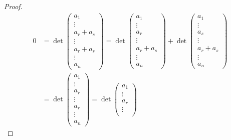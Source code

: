 \documentclass[letterpaper]{article}
\begin{document}
\begin{enumerate}
\begin{enumerate}[label=(\alph*)]
\begin{proof}
    \begin{align*}
        0
        &=
            \det\begin{pmatrix}
                a_1\\
                \vdots\\
                a_r + a_s\\
                \vdots\\
                a_r + a_s\\
                \vdots\\
                a_n
            \end{pmatrix} =
            \det\begin{pmatrix}
                a_1\\
                \vdots\\
                a_r\\
                \vdots\\
                a_r + a_s\\
                \vdots\\
                a_n
            \end{pmatrix} +
            \det\begin{pmatrix}
                a_1\\
                \vdots\\
                a_s\\
                \vdots\\
                a_r + a_s\\
                \vdots\\
                a_n
            \end{pmatrix}\\
        &=
            \det\begin{pmatrix}
                a_1\\
                \vdots\\
                a_r\\
                \vdots\\
                a_r\\
                \vdots\\
                a_n
            \end{pmatrix} =
            \det\begin{pmatrix}
                a_1\\
                \vdots\\
                a_r\\
                \vdots\\

\end{pmatrix}
\end{align*}
\end{proof}
\end{enumerate}
\end{enumerate}
\end{document}
